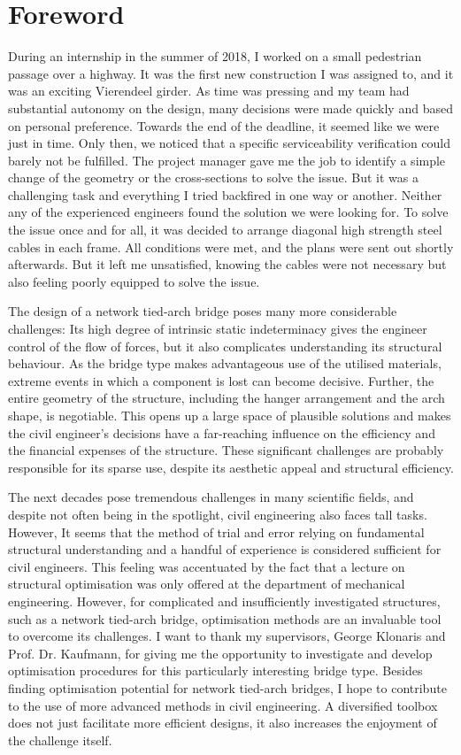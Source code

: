 \section*{Foreword}

During an internship in the summer of 2018, I worked on a small pedestrian passage over a highway. It was the first new construction I was assigned to, and it was an exciting Vierendeel girder. As time was pressing and my team had substantial autonomy on the design, many decisions were made quickly and based on personal preference. Towards the end of the deadline, it seemed like we were just in time. Only then, we noticed that a specific serviceability verification could barely not be fulfilled. The project manager gave me the job to identify a simple change of the geometry or the cross-sections to solve the issue. But it was a challenging task and everything I tried backfired in one way or another. Neither any of the experienced engineers found the solution we were looking for. To solve the issue once and for all, it was decided to arrange diagonal high strength steel cables in each frame. All conditions were met, and the plans were sent out shortly afterwards. But it left me unsatisfied, knowing the cables were not necessary but also feeling poorly equipped to solve the issue.\medskip

The design of a network tied-arch bridge poses many more considerable challenges: Its high degree of intrinsic static indeterminacy gives the engineer control of the flow of forces, but it also complicates understanding its structural behaviour. As the bridge type makes advantageous use of the utilised materials, extreme events in which a component is lost can become decisive. Further, the entire geometry of the structure, including the hanger arrangement and the arch shape, is negotiable. This opens up a large space of plausible solutions and makes the civil engineer's decisions have a far-reaching influence on the efficiency and the financial expenses of the structure. These significant challenges are probably responsible for its sparse use, despite its aesthetic appeal and structural efficiency. \medskip

The next decades pose tremendous challenges in many scientific fields, and despite not often being in the spotlight, civil engineering also faces tall tasks. However, It seems that the method of trial and error relying on fundamental structural understanding and a handful of experience is considered sufficient for civil engineers. This feeling was accentuated by the fact that a lecture on structural optimisation was only offered at the department of mechanical engineering. However, for complicated and insufficiently investigated structures, such as a network tied-arch bridge, optimisation methods are an invaluable tool to overcome its challenges. I want to thank my supervisors, George Klonaris and Prof. Dr. Kaufmann, for giving me the opportunity to investigate and develop optimisation procedures for this particularly interesting bridge type. Besides finding optimisation potential for network tied-arch bridges, I hope to contribute to the use of more advanced methods in civil engineering. A diversified toolbox does not just facilitate more efficient designs, it also increases the enjoyment of the challenge itself.